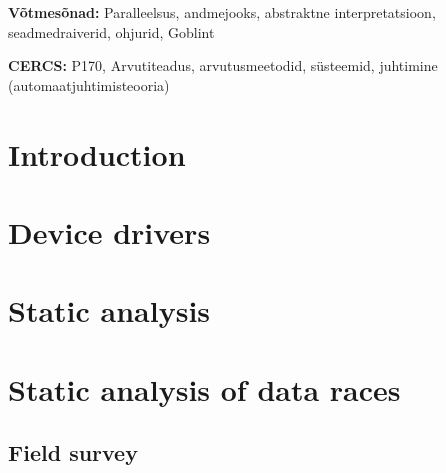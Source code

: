 \documentclass{style/master-thesis}
\begin{document}
\begin{flushleft}
  \textbf{Võtmesõnad:} Paralleelsus, andmejooks, abstraktne interpretatsioon, seadmedraiverid, ohjurid, Goblint
\end{flushleft}
\vspace*{3ex}

\noindent\textbf{CERCS:} P170, Arvutiteadus, arvutusmeetodid, süsteemid, juhtimine (automaatjuhtimisteooria)

\newpage




\tableofcontents



\section{Introduction}


\pagebreak

\section{Device drivers}
\label{sec:device-drivers}


\pagebreak


\section{Static analysis}
\label{sec:static-analysis}


\pagebreak

\section{Static analysis of data races}
\label{sec:data-races}


\subsection{Field survey}


\pagebreak


%
\end{document}
